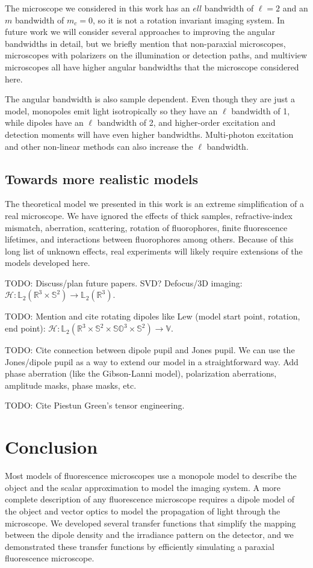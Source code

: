 \documentclass[]{osa-article}
\providecommand{\mc}[1]{\mathcal{#1}}
\providecommand{\mbb}[1]{\mathbb{#1}}
\begin{document}
The microscope we considered in this work has an $ell$ bandwidth of $\ell = 2$
and an $m$ bandwidth of $m_c = 0$, so it is not a rotation invariant imaging
system. In future work we will consider several approaches to improving the
angular bandwidths in detail, but we briefly mention that non-paraxial
microscopes, microscopes with polarizers on the illumination or detection paths,
and multiview microscopes all have higher angular bandwidths that the microscope
considered here.

The angular bandwidth is also sample dependent. Even though they are just a
model, monopoles emit light isotropically so they have an $\ell$ bandwidth of 1,
while dipoles have an $\ell$ bandwidth of 2, and higher-order excitation and
detection moments will have even higher bandwidths. Multi-photon excitation and
other non-linear methods can also increase the $\ell$ bandwidth. 

\subsection{Towards more realistic models}
The theoretical model we presented in this work is an extreme simplification of a
real microscope. We have ignored the effects of thick samples, refractive-index
mismatch, aberration, scattering, rotation of fluorophores, finite fluorescence
lifetimes, and interactions between fluorophores among others. Because of this
long list of unknown effects, real experiments will likely require extensions of
the models developed here.

TODO: Discuss/plan future papers. SVD? Defocus/3D imaging:
$\mc{H}: \mbb{L}_2(\mbb{R}^3\times\mbb{S}^2) \rightarrow \mbb{L}_2(\mbb{R}^3)$.

TODO: Mention and cite rotating dipoles like Lew (model start point, rotation, end point):
$\mc{H}: \mbb{L}_2(\mbb{R}^3\times\mbb{S}^2\times\mbb{SO}^3\times\mbb{S}^2) \rightarrow \mbb{V}$. 

TODO: Cite connection between dipole pupil and Jones pupil. We can use the
Jones/dipole pupil as a way to extend our model in a straightforward way. Add
phase aberration (like the Gibson-Lanni model), polarization aberrations,
amplitude masks, phase masks, etc.

TODO: Cite Piestun Green's tensor engineering.

\section{Conclusion}
Most models of fluorescence microscopes use a monopole model to describe the
object and the scalar approximation to model the imaging system. A more complete
description of any fluorescence microscope requires a dipole model of the object
and vector optics to model the propagation of light through the microscope. We
developed several transfer functions that simplify the mapping between the
dipole density and the irradiance pattern on the detector, and we demonstrated
these transfer functions by efficiently simulating a paraxial fluorescence
microscope.
\end{document}
